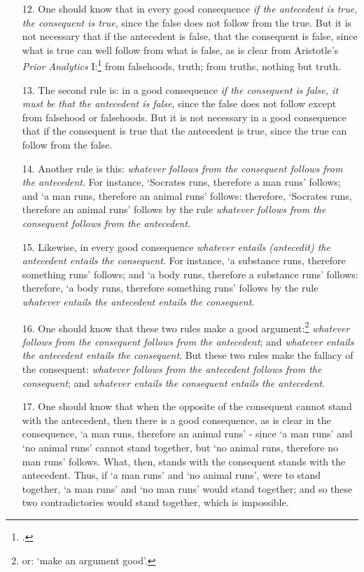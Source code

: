 \begin{enumerate}
\item[12.] One should know that in every good consequence \textit{if the antecedent is true, the consequent is true}, since the false does not follow from the true. But it is not necessary that if the antecedent is false, that the consequent is false, since what is true can well follow from what is false, as is clear from Aristotle's \textit{Prior Analytics} I:\footnote{\cite[II. 2, p. 53b 7sq]{AristotlePrA}.} from falsehoods, truth; from truths, nothing but truth.
\item[13.] The second rule is: in a good consequence \textit{if the consequent is false, it must be that the antecedent is false}, since the false does not follow except from falsehood or falsehoods. But it is not necessary in a good consequence that if the consequent is true that the antecedent is true, since the true can follow from the false.
\item[14.] Another rule is this: \textit{whatever follows from the consequent follows from the antecedent}. For instance, `Socrates runs, therefore a man runs' follows; and `a man runs, therefore an animal runs' follows: therefore, `Socrates runs, therefore an animal runs' follows by the rule \textit{whatever follows from the consequent follows from the antecedent}.
\item[15.] Likewise, in every good consequence \textit{whatever entails (antecedit) the antecedent entails the consequent}. For instance, `a substance runs, therefore something runs' follows; and `a body runs, therefore a substance runs' follows: therefore, `a body runs, therefore something runs' follows by the rule \textit{whatever entails the antecedent entails the consequent}.
\item[16.] One should know that these two rules make a good argument:\footnote{or: `make an argument good'.} \textit{whatever follows from the consequent follows from the antecedent}; and \textit{whatever entails the antecedent entails the consequent}. But these two rules make the fallacy of the consequent: \textit{whatever follows from the antecedent follows from the consequent}; and \textit{whatever entails the consequent entails the antecedent}.
\item[17.] One should know that when the opposite of the consequent cannot stand with the antecedent, then there is a good consequence, as is clear in the consequence, `a man runs, therefore an animal runs' - since `a man runs' and `no animal runs' cannot stand together, but `no animal runs, therefore no man runs' follows. What, then, stands with the consequent stands with the antecedent. Thus, if `a man runs' and `no animal runs', were to stand together, `a man runs' and `no man runs' would stand together; and so these two contradictories would stand together, which is impossible.

\end{enumerate}
